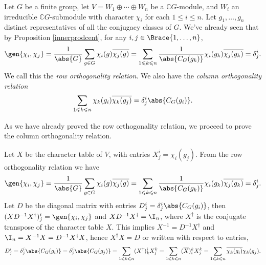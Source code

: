 \documentclass[../Project.tex]{subfiles}
\begin{document}
\begin{theo}
	Let $G$ be a finite group, let $V = W_1 \oplus \cdots \oplus W_n$ be a $\mathbb{C}G$-module, and $W_i$ an irreducible $\mathbb{C}G$-submodule with character $\chi_i$ for each $1 \leqslant i \leqslant n$. Let $g_1,\dots,g_n$ distinct representatives of all the conjugacy classes of $G$. We've already seen that by Proposition \ref{innerprodcent}, for any $i,j \in \Brace{1,\dots,n}$,
	$$\gen{\chi_i,\chi_j} = \frac{1}{\abs{G}}\sum_{g \in G}\chi_i(g)\overline{\chi_j(g)} =  \sum_{1 \leqslant k \leqslant n}\frac{1}{\abs{C_G(g_k)}}\chi_i(g_k)\overline{\chi_j(g_k)} = \delta^i_j.$$
	We call this the \textit{row orthogonality relation}. We also have the \textit{column orthogonality relation}
	$$\sum_{1 \leqslant k \leqslant n}\chi_k(g_i)\overline{\chi_k(g_j)} = \delta^i_j\abs{C_G(g_i)}.$$
\end{theo}
As we have already proved the row orthogonality relation, we proceed to prove the column orthogonality relation.
\begin{proo*}
	Let $X$ be the character table of $V$, with entries $X^i_j = \chi_i(g_j)$. From the row orthogonality relation we have
	$$\gen{\chi_i,\chi_j} = \frac{1}{\abs{G}}\sum_{g \in G}\chi_i(g)\overline{\chi_j(g)} = \sum_{1 \leqslant k \leqslant n}\frac{1}{\abs{C_G(g_k)}}\chi_i(g_k)\overline{\chi_j(g_k)} = \delta^i_j.$$
	Let $D$ be the diagonal matrix with entries $D^i_j = \delta^i_j\abs{C_G(g_i)}$, then
	$(XD^{-1}X^\dagger)^i_j = \gen{\chi_i,\chi_j}$ and $XD^{-1}X^\dagger = \I_n$, where $X^\dagger$ is the conjugate transpose of the character table $X$.
	This implies $X^{-1} = D^{-1}X^\dagger$ and $\I_n = X^{-1}X = D^{-1}X^\dagger X$, hence $X^\dagger X = D$ or written with respect to entries,
	$$D^i_j = \delta^i_j\abs{C_G(g_i)} = \delta^i_j\abs{C_G(g_j)} = \sum_{1 \leqslant k \leqslant n}(X^\dagger)^i_kX^k_j = \sum_{1 \leqslant k \leqslant n}(\overline{X})^k_iX^k_j = \sum_{1 \leqslant k \leqslant n}\overline{\chi_k(g_i)}\chi_k(g_j).$$\\
\end{proo*}
\end{document}
